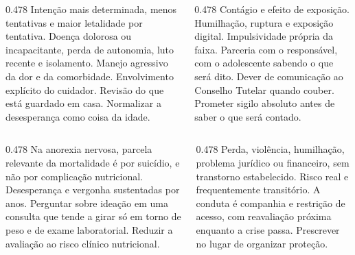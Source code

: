 %

\begin{frame}{}
\begin{columns}[onlytextwidth, T]
\begin{column}{0.478\textwidth}
{Inten\c{c}\~ao mais determinada, menos tentativas e maior letalidade por
tentativa. Doen\c{c}a dolorosa ou incapacitante, perda de autonomia, luto
recente e isolamento.}
{Manejo agressivo da dor e da comorbidade. Envolvimento expl\'icito do
cuidador. Revis\~ao do que est\'a guardado em casa.}
{Normalizar a desesperan\c{c}a como coisa da idade.}
\end{column}
\calha
\begin{column}{0.478\textwidth}
{Cont\'agio e efeito de exposi\c{c}\~ao. Humilha\c{c}\~ao, ruptura e
exposi\c{c}\~ao digital. Impulsividade pr\'opria da faixa.}
{Parceria com o respons\'avel, com o adolescente sabendo o que ser\'a dito.
Dever de comunica\c{c}\~ao ao Conselho Tutelar quando couber.}
{Prometer sigilo absoluto antes de saber o que ser\'a contado.}
\end{column}
\end{columns}
\end{frame}

\begin{frame}{}
\begin{columns}[onlytextwidth, T]
\begin{column}{0.478\textwidth}
{Na anorexia nervosa, parcela relevante da mortalidade \'e por suic\'idio, e
n\~ao por complica\c{c}\~ao nutricional. Desesperan\c{c}a e vergonha
sustentadas por anos.}
{Perguntar sobre idea\c{c}\~ao em uma consulta que tende a girar s\'o em torno
de peso e de exame laboratorial.}
{Reduzir a avalia\c{c}\~ao ao risco cl\'inico nutricional.}
\end{column}
\calha
\begin{column}{0.478\textwidth}
{Perda, viol\^encia, humilha\c{c}\~ao, problema jur\'idico ou financeiro, sem
transtorno estabelecido. Risco real e frequentemente transit\'orio.}
{A conduta \'e companhia e restri\c{c}\~ao de acesso, com reavalia\c{c}\~ao
pr\'oxima enquanto a crise passa.}
{Prescrever no lugar de organizar prote\c{c}\~ao.}
\end{column}
\end{columns}
\end{frame}
